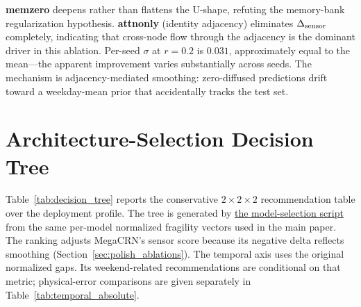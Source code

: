 \textbf{memzero} deepens rather than flattens the U-shape, refuting the
memory-bank regularization hypothesis. \textbf{attnonly} (identity adjacency)
eliminates $\Delta_{\text{sensor}}$ completely, indicating that cross-node flow
through the adjacency is the dominant driver in this ablation. Per-seed
$\sigma$ at $r{=}0.2$ is $0.031$, approximately equal to the mean---the
apparent improvement varies substantially across seeds. The mechanism is adjacency-mediated smoothing: zero-diffused
predictions drift toward a weekday-mean prior that accidentally tracks the
test set.

\section{Architecture-Selection Decision Tree}
\label{sec:appendix_decision_tree}

Table~\ref{tab:decision_tree} reports the conservative $2{\times}2{\times}2$
recommendation table over the deployment profile. The tree is generated by
\href{https://github.com/sirjuststop/stgnn-shift-bench/blob/main/experiments/decision_tree_artifact.py}{the model-selection script} from the same per-model
normalized fragility vectors used in the main paper. The ranking adjusts MegaCRN's sensor score because its negative delta reflects smoothing (Section~\ref{sec:polish_ablations}).
The temporal axis uses the original normalized gaps. Its weekend-related
recommendations are conditional on that metric; physical-error comparisons
are given separately in Table~\ref{tab:temporal_absolute}.

